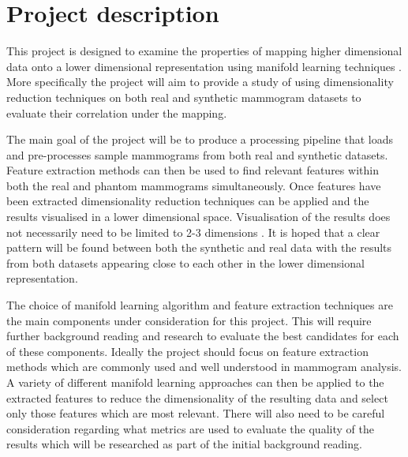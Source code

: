 \documentclass[11pt,fleqn,twoside]{article}
\begin{document}
\wordcount{}

\mmp

\setcounter{tocdepth}{3} %


\section{Project description}
This project is designed to examine the properties of mapping higher dimensional data onto a lower dimensional representation using manifold learning techniques \cite{cayton2005algorithms}. More specifically the project will aim to provide a study of using dimensionality reduction techniques on both real \cite{suckling1994mammographic} and synthetic\cite{bakic2002mammogram1, bakic2002mammogram2, bakic2003mammogram3} mammogram datasets to evaluate their correlation under the mapping.

The main goal of the project will be to produce a processing pipeline that loads and pre-processes sample mammograms from both real and synthetic datasets. Feature extraction methods can then be used to find relevant features within both the real and phantom mammograms simultaneously. Once features have been extracted dimensionality reduction techniques can be applied and the results visualised in a lower dimensional space. Visualisation of the results does not necessarily need to be limited to 2-3 dimensions \cite{bertini2011quality}. It is hoped that a clear pattern will be found between both the synthetic and real data with the results from both datasets appearing close to each other in the lower dimensional representation.

The choice of manifold learning algorithm and feature extraction techniques are the main components under consideration for this project. This will require further background reading and research to evaluate the best candidates for each of these components. Ideally the project should focus on feature extraction methods which are commonly used and well understood in mammogram analysis. A variety of different manifold learning approaches can then be applied to the extracted features to reduce the dimensionality of the resulting data and select only those features which are most relevant. There will also need to be careful consideration regarding what metrics are used to evaluate the quality of the results which will be researched as part of the initial background reading.
\end{document}
